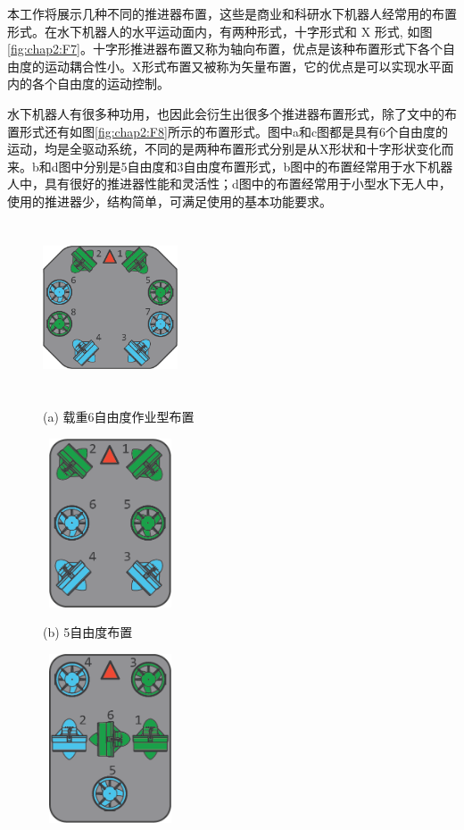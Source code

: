 本工作将展示几种不同的推进器布置，这些是商业和科研水下机器人经常用的布置形式。在水下机器人的水平运动面内，有两种形式，十字形式和 X 形式, 如图\ref{fig:chap2:F7}\cite{dos2016bank}。十字形推进器布置又称为轴向布置，优点是该种布置形式下各个自由度的运动耦合性小。X形式布置又被称为矢量布置，它的优点是可以实现水平面内的各个自由度的运动控制。

水下机器人有很多种功用，也因此会衍生出很多个推进器布置形式，除了文中的布置形式还有如图\ref{fig:chap2:F8}所示的布置形式\cite{ardusub}。图中a和c图都是具有6个自由度的运动，均是全驱动系统，不同的是两种布置形式分别是从X形状和十字形状变化而来。b和d图中分别是5自由度和3自由度布置形式，b图中的布置经常用于水下机器人中，具有很好的推进器性能和灵活性；d图中的布置经常用于小型水下无人中，使用的推进器少，结构简单，可满足使用的基本功能要求。

\begin{figure}
\begin{minipage}{0.48\linewidth}
  \centerline{\includegraphics[width=4.0cm,height = 5cm]{figure/chap2/vectored6dof-frame.png}}
  \centerline{(a) 载重6自由度作业型布置}
\end{minipage}
\hfill
\begin{minipage}{.48\linewidth}
  \centerline{\includegraphics[width=4.0cm,height = 5cm]{figure/chap2/vectored-frame.png}}
  \centerline{(b) 5自由度布置}
\end{minipage}
\vfill
\begin{minipage}{0.48\linewidth}
  \centerline{\includegraphics[width=4.0cm,height = 5cm]{figure/chap2/bluerov-frame.png}}

\end{minipage}
\end{figure}
